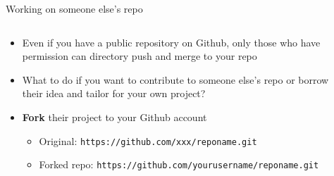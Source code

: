 \documentclass[handout,pdftex,10pt,aspectratio=169]{beamer}
\begin{document}
\begin{frame}{Working on someone else's repo}
  \begin{columns}[c]
    \begin{column}{0.55\linewidth}
      \begin{itemize}[<+->]\setlength\itemsep{10pt}
        \setlength{\leftmarginii}{10pt}
        \item Even if you have a public repository on Github, only those who have permission 
        can directory push and merge to your repo
        \item What to do if you want to contribute to someone else's repo or borrow their idea and 
        tailor for your own project?
        \item \textbf{Fork} their project to your Github account
        \begin{itemize}
          \item Original: \texttt{https://github.com/xxx/reponame.git}
          \item Forked repo: \texttt{https://github.com/yourusername/reponame.git}
        \end{itemize}
      \end{itemize}
        \end{column}\hfill
    \begin{column}{0.44\linewidth}
      \centering
      \end{column}
  \end{columns}
\end{frame}
\end{document}
